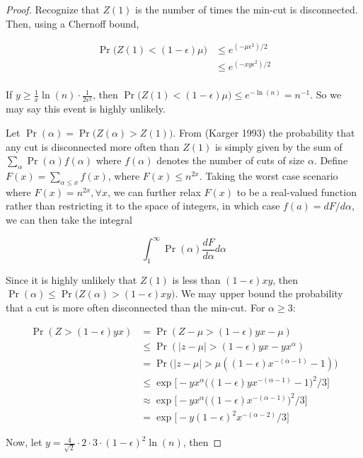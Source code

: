 \documentclass[12pt]{article}
\begin{document}
\begin{proof}
Recognize that $Z(1)$ is the number of times the min-cut is disconnected. Then, using a Chernoff bound, 

\begin{align*}
\Pr \bigg(Z(1) < (1-\epsilon) \mu \bigg) &\leq e^{(-\mu \epsilon^2)/2} \\
&\leq e^{(-xy \epsilon^2)/2} \\
\end{align*}

If $y \geq \frac{1}{x} \ln(n) \cdot \frac{1}{2\epsilon^2}$, then $\Pr \bigg(Z(1) < (1-\epsilon)\mu \bigg) \leq e^{-\ln(n)} = n^{-1}$. So we may say this event is highly unlikely. 

Let $\Pr(\alpha) = \Pr \bigg( Z(\alpha) > Z(1) \bigg)$. From (Karger 1993) the probability that any cut is disconnected more often than $Z(1)$ is simply given by the sum of $\sum_{\alpha} \Pr(\alpha) f(\alpha)$ where $f(\alpha)$ denotes the number of cuts of size $\alpha$. Define $F(x) = \sum_{\alpha \leq x} f(x)$, where $F(x) \leq n^{2x}$. Taking the worst case scenario where $F(x) = n^{2x}, \forall x$, we can further relax $F(x)$ to be a real-valued function rather than restricting it to the space of integers, in which case $f(a) = dF/d\alpha$, we can then take the integral

\[
\int_{1}^\infty \Pr(\alpha) \frac{dF}{d\alpha} d\alpha
\]

Since it is highly unlikely that $Z(1)$ is less than $(1-\epsilon)xy$, then $\Pr(\alpha) \leq \Pr \bigg(Z(\alpha) > (1-\epsilon)xy \bigg)$. We may upper bound the probability that a cut is more often disconnected than the min-cut. For $\alpha \geq 3$:

\begin{align*}
\Pr(Z > (1 - \epsilon)yx) &= \Pr(Z - \mu > (1 - \epsilon)yx - \mu) \\
&\leq \Pr(|z-\mu| > (1-\epsilon)yx - yx^\alpha) \\
&= \Pr \bigg(|z-\mu| > \mu ((1-\epsilon) x^{-(\alpha-1)}-1)\bigg) \\
&\leq \exp \bigg[-yx^\alpha \bigg((1-\epsilon)yx^{-(\alpha-1)}-1\bigg)^2/3\bigg] \\
&\approx \exp \bigg[-yx^\alpha \bigg((1-\epsilon)x^{-(\alpha - 1)}\bigg)^2/3\bigg] \\
&= \exp \bigg[-y (1-\epsilon)^2 x^{-(\alpha-2)}/3\bigg]
\end{align*}

Now, let $y = \frac{4}{\sqrt{2}} \cdot 2 \cdot 3 \cdot (1-\epsilon)^2 \ln{(n)}$, then


\end{proof}
\end{document}
